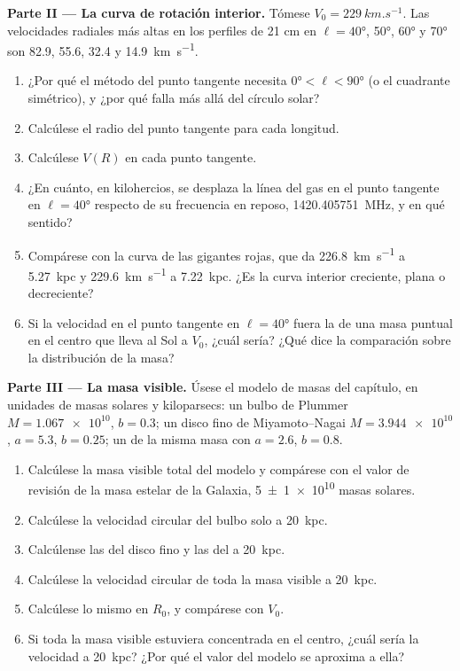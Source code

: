\begin{problem}
\medskip\noindent\textbf{Parte II --- La curva de rotación interior.} Tómese
$V_0 = \qty{229}{km.s^{-1}}$. Las velocidades radiales más altas en los
perfiles de 21 cm en $\ell = \ang{40}$, \ang{50}, \ang{60} y \ang{70} son
82.9, 55.6, 32.4 y \qty{14.9}{km.s^{-1}}.
\begin{enumerate}[resume]
\item ¿Por qué el método del punto tangente necesita $\ang{0} < \ell < \ang{90}$
  (o el cuadrante simétrico), y ¿por qué falla más allá del círculo solar?
\item Calcúlese el radio del punto tangente para cada longitud.
\item Calcúlese $V(R)$ en cada punto tangente.
\item ¿En cuánto, en kilohercios, se desplaza la línea del gas en el punto tangente
  en $\ell = \ang{40}$ respecto de su frecuencia en reposo,
  \qty{1420.405751}{MHz}, y en qué sentido?
\item Compárese con la curva de las gigantes rojas, que da \qty{226.8}{km.s^{-1}}
  a \qty{5.27}{kpc} y \qty{229.6}{km.s^{-1}} a \qty{7.22}{kpc}. ¿Es la
  curva interior creciente, plana o decreciente?
\item Si la velocidad en el punto tangente en $\ell = \ang{40}$ fuera la de
  una masa puntual en el centro que lleva al Sol a $V_0$, ¿cuál sería?
  ¿Qué dice la comparación sobre la distribución de la masa?
\end{enumerate}

\medskip\noindent\textbf{Parte III --- La masa visible.} Úsese el modelo de masas
del capítulo, en unidades de masas solares y kiloparsecs: un
bulbo de Plummer $M = \num{1.067e10}$, $b = 0.3$; un disco fino de Miyamoto--Nagai
$M = \num{3.944e10}$, $a = 5.3$, $b = 0.25$; un  de la misma
masa con $a = 2.6$, $b = 0.8$.
\begin{enumerate}[resume]
\item Calcúlese la masa visible total del modelo y compárese con el
  valor de revisión de la masa estelar de la Galaxia, \qty[separate-uncertainty=true]{5 \pm 1 e10}{} masas
  solares.
\item Calcúlese la velocidad circular del bulbo solo a \qty{20}{kpc}.
\item Calcúlense las del disco fino y las del  a \qty{20}{kpc}.
\item Calcúlese la velocidad circular de toda la masa visible a
  \qty{20}{kpc}.
\item Calcúlese lo mismo en $R_0$, y compárese con $V_0$.
\item Si toda la masa visible estuviera concentrada en el centro, ¿cuál sería
  la velocidad a \qty{20}{kpc}? ¿Por qué el valor del modelo se aproxima a ella?
\end{enumerate}


\end{problem}
